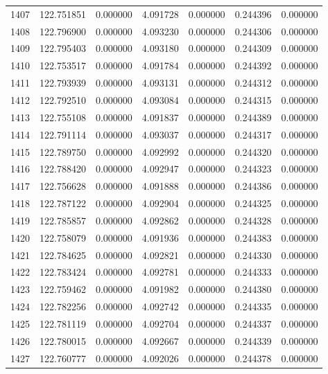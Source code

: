 \begin{tabular}{rrrrrrr}
1407 & 122.751851 &    0.000000 &  4.091728 &   0.000000 &   0.244396 &  0.000000 \\
1408 & 122.796900 &    0.000000 &  4.093230 &   0.000000 &   0.244306 &  0.000000 \\
1409 & 122.795403 &    0.000000 &  4.093180 &   0.000000 &   0.244309 &  0.000000 \\
1410 & 122.753517 &    0.000000 &  4.091784 &   0.000000 &   0.244392 &  0.000000 \\
1411 & 122.793939 &    0.000000 &  4.093131 &   0.000000 &   0.244312 &  0.000000 \\
1412 & 122.792510 &    0.000000 &  4.093084 &   0.000000 &   0.244315 &  0.000000 \\
1413 & 122.755108 &    0.000000 &  4.091837 &   0.000000 &   0.244389 &  0.000000 \\
1414 & 122.791114 &    0.000000 &  4.093037 &   0.000000 &   0.244317 &  0.000000 \\
1415 & 122.789750 &    0.000000 &  4.092992 &   0.000000 &   0.244320 &  0.000000 \\
1416 & 122.788420 &    0.000000 &  4.092947 &   0.000000 &   0.244323 &  0.000000 \\
1417 & 122.756628 &    0.000000 &  4.091888 &   0.000000 &   0.244386 &  0.000000 \\
1418 & 122.787122 &    0.000000 &  4.092904 &   0.000000 &   0.244325 &  0.000000 \\
1419 & 122.785857 &    0.000000 &  4.092862 &   0.000000 &   0.244328 &  0.000000 \\
1420 & 122.758079 &    0.000000 &  4.091936 &   0.000000 &   0.244383 &  0.000000 \\
1421 & 122.784625 &    0.000000 &  4.092821 &   0.000000 &   0.244330 &  0.000000 \\
1422 & 122.783424 &    0.000000 &  4.092781 &   0.000000 &   0.244333 &  0.000000 \\
1423 & 122.759462 &    0.000000 &  4.091982 &   0.000000 &   0.244380 &  0.000000 \\
1424 & 122.782256 &    0.000000 &  4.092742 &   0.000000 &   0.244335 &  0.000000 \\
1425 & 122.781119 &    0.000000 &  4.092704 &   0.000000 &   0.244337 &  0.000000 \\
1426 & 122.780015 &    0.000000 &  4.092667 &   0.000000 &   0.244339 &  0.000000 \\
1427 & 122.760777 &    0.000000 &  4.092026 &   0.000000 &   0.244378 &  0.000000 \\

\end{tabular}
